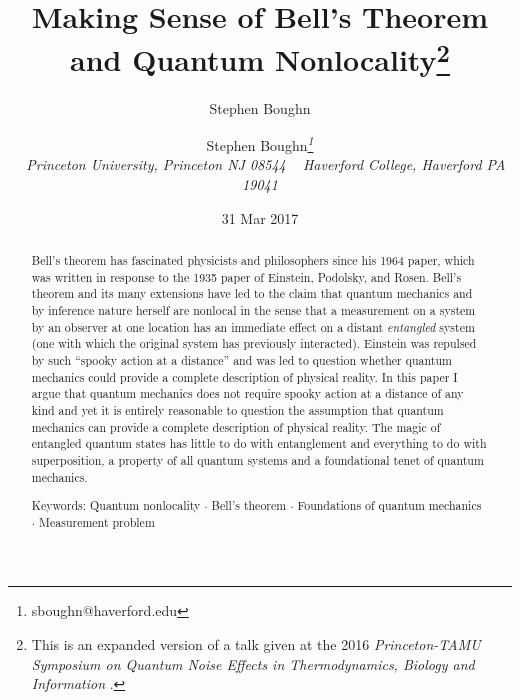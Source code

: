 \documentclass[12pt]{article}
\def\\{\hfill\break} \let\==\equiv
\begin{document}
\title{Making Sense of Bell's Theorem and Quantum Nonlocality\footnote{This is an expanded version of a talk given at the 2016 {\it Princeton-TAMU Symposium on Quantum Noise Effects in Thermodynamics, Biology and Information} \cite{Bou16}.}}
\author {Stephen Boughn{\small\it\thanks{sboughn@haverford.edu}}\author{Stephen Boughn}
\\[2mm]
~ \it Princeton University, Princeton NJ 08544 \\
~ \it Haverford College, Haverford PA 19041}

\date{31 Mar 2017}

\maketitle


\begin{abstract}
Bell's theorem has fascinated physicists and philosophers since his 1964 paper, which was written in response to the 1935 paper of Einstein, Podolsky, and Rosen. Bell's theorem and its many extensions have led to the claim that quantum mechanics and by inference nature herself are nonlocal in the sense that a measurement on a system by an observer at one location has an immediate effect on a distant {\it entangled} system (one with which the original system has previously interacted). Einstein was repulsed by such ``spooky action at a distance'' and was led to question whether quantum mechanics could provide a complete description of physical reality. In this paper I argue that quantum mechanics does not require spooky action at a distance of any kind and yet it is entirely reasonable to question the assumption that quantum mechanics can provide a complete description of physical reality. The magic of entangled quantum states has little to do with entanglement and everything to do with superposition, a property of all quantum systems and a foundational tenet of quantum mechanics.

\\ {\small{Keywords: Quantum nonlocality $\cdot$ Bell's theorem $\cdot$ Foundations of quantum mechanics $\cdot$ Measurement problem}}

\end{abstract}

\maketitle
\end{document}
